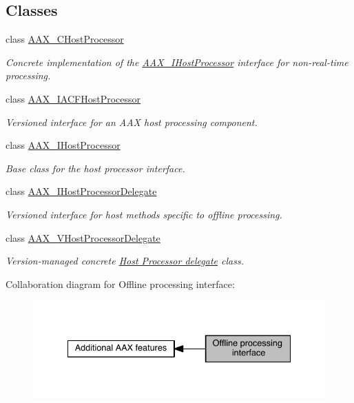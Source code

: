 \subsection*{Classes}
\begin{DoxyCompactItemize}
\item 
class \hyperlink{a00020}{A\+A\+X\+\_\+\+C\+Host\+Processor}
\begin{DoxyCompactList}\small\item\em Concrete implementation of the \hyperlink{a00101}{A\+A\+X\+\_\+\+I\+Host\+Processor} interface for non-\/real-\/time processing. \end{DoxyCompactList}\item 
class \hyperlink{a00066}{A\+A\+X\+\_\+\+I\+A\+C\+F\+Host\+Processor}
\begin{DoxyCompactList}\small\item\em Versioned interface for an A\+A\+X host processing component. \end{DoxyCompactList}\item 
class \hyperlink{a00101}{A\+A\+X\+\_\+\+I\+Host\+Processor}
\begin{DoxyCompactList}\small\item\em Base class for the host processor interface. \end{DoxyCompactList}\item 
class \hyperlink{a00102}{A\+A\+X\+\_\+\+I\+Host\+Processor\+Delegate}
\begin{DoxyCompactList}\small\item\em Versioned interface for host methods specific to offline processing. \end{DoxyCompactList}\item 
class \hyperlink{a00136}{A\+A\+X\+\_\+\+V\+Host\+Processor\+Delegate}
\begin{DoxyCompactList}\small\item\em Version-\/managed concrete \hyperlink{a00102}{Host Processor delegate} class. \end{DoxyCompactList}\end{DoxyCompactItemize}
Collaboration diagram for Offline processing interface\+:
\nopagebreak
\begin{figure}[H]
\begin{center}
\leavevmode
\includegraphics[width=335pt]{a00334}
\end{center}
\end{figure}
